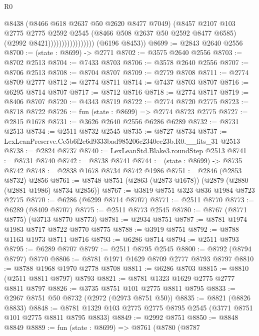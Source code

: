 \begin{lexlean}{R0}
\begin{coremodule}
                                    @8438
                                    (@8466 @618 @2637 @50 @2620 @8477 @7049)
                                    (@8457
                                      @2107
                                      @103
                                      @2775
                                      @2775
                                      @2592
                                      @2545
                                      (@8466 @508 @2637 @50 @2592 @8477 @6585)
                                      (@2992 @8421)))))))))))))))))
      (@6196 @8453))
@8699 := @2843 @2640 @2556
@8700 := (state : @8699) -> @2771
@8702 := @3575 @2640 @2556
@8703 := @8702 @2513
@8704 := @7433 @8703
@8706 := @3578 @2640 @2556
@8707 := @8706 @2513
@8708 := @8704 @8707
@8709 := @2779 @8708
@8711 := @2774 @8709 @2777
@8712 := @2774 @8711
@8714 := @7437 @8703 @8707
@8716 := @6295 @8714 @8707
@8717 := @8712 @8716
@8718 := @2774 @8717
@8719 := @8406 @8707
@8720 := @4343 @8719
@8722 := @2774 @8720 @2775
@8723 := @8718 @8722
@8726 := fun (state : @8699) => @2774 @8723 @2775
@8727 := @2815 @1678
@8731 := @3626 @2640 @2556 @6286 @6289
@8732 := @8731 @2513
@8734 := @2511 @8732 @2545
@8735 := @8727 @8734
@8737 := LexLeanPreserve.Cc5b6f2e6d9333bad985206c2340ec23b.R0.__fits_31 @2513
@8738 := @2824 @8737
@8740 := LexLeanStd.Blake3.roundStep @2513
@8741 := @8731 @8740
@8742 := @8738 @8741
@8744 := (state : @8699) -> @8735 @8742
@8748 := @2838 @1678 @8734 @8742 @1986
@8751 := @2846 (@2853 @8732) @2856
@8761 := @8748 @8751 (@2863 (@2873 @1678)) (@2879 (@2880 (@2881 @1986) @8734 @2856))
@8767 := @3819 @8751 @323 @836 @1984 @8723 @2775
@8770 := @6286 (@6299 @8714 @8707)
@8771 := @2511 @8770
@8773 := @6289 (@8409 @8707)
@8775 := @2511 @8773 @2545
@8780 := @8767 (@8771 @8775) (@3713 @8770 @8773)
@8781 := @2934 @8751
@8787 := @8781 @1974 @1983 @8717 @8722 @8770 @8775
@8788 := @3919 @8751
@8792 := @8788 @1163 @1973 @8711 @8716
@8793 := @6286 @8714
@8794 := @2511 @8793
@8795 := @6289 @8707
@8797 := @2511 @8795 @2545
@8800 := @8792 (@8794 @8797) @8770
@8806 := @8781 @1971 @1629 @8709 @2777 @8793 @8797
@8810 := @8788 @1968 @1970 @2778 @8708
@8811 := @6286 @8703
@8815 := @8810 (@2511 @8811 @8797) @8793
@8821 := @8781 @1323 @1629 @2775 @2777 @8811 @8797
@8826 := @3735 @8751 @101 @2775 @8811 @8795
@8833 := @2967 @8751 @50 @8732 (@2972 (@2973 @8751 @50))
@8835 := @8821 (@8826 @8833)
@8848 := @8781 @1329 @103 @2775 @2775 @8795 @2545 (@3771 @8751 @101 @2775 @8811 @8795 @8833)
@8849 := @2992 @8751
@8850 := @8848 @8849
@8889 := fun (state : @8699) =>
  @8761
    (@8780
      (@8787

\end{coremodule}
\end{lexlean}
